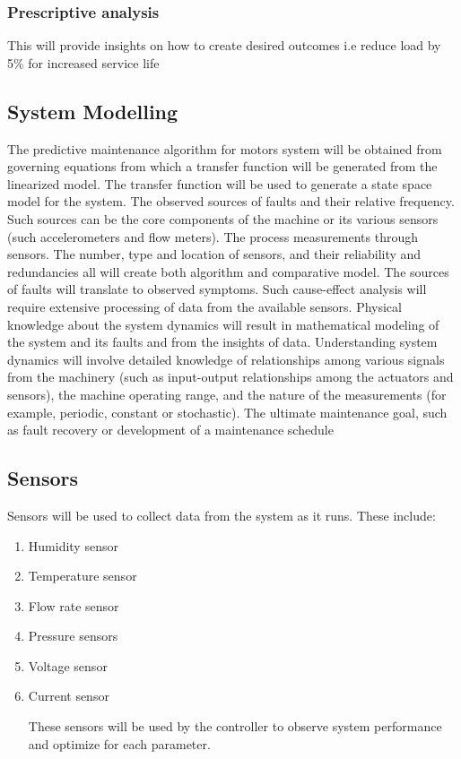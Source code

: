 	\subsubsection{Prescriptive analysis}
	This will provide insights on how to create desired outcomes i.e reduce load by 5\% for increased service life 
	
\subsection{System Modelling}

The predictive maintenance algorithm for motors system will be obtained from governing
equations from which a transfer function will be generated from the linearized model. The
transfer function will be used to generate a state space model for the system.
The observed sources of faults and their relative frequency. Such sources can be the core
components of the machine or its various sensors (such accelerometers and flow meters).
The process measurements through sensors. The number, type and location of sensors,
and their reliability and redundancies all will create both algorithm and comparative
model.
The sources of faults will translate to observed symptoms. Such cause-effect analysis will
require extensive processing of data from the available sensors.
Physical knowledge about the system dynamics will result in mathematical modeling of
the system and its faults and from the insights of data. Understanding system dynamics
will involve detailed knowledge of relationships among various signals from the machinery
(such as input-output relationships among the actuators and sensors), the machine operating
range, and the nature of the measurements (for example, periodic, constant or stochastic).
The ultimate maintenance goal, such as fault recovery or development of a maintenance
schedule




\subsection{ Sensors}
Sensors will be used to collect data from the system as it runs. These include:
\begin{enumerate}
	\item Humidity sensor
	\item Temperature sensor
	\item Flow rate sensor
	\item Pressure sensors
	\item Voltage sensor
	\item Current sensor
	
	These sensors will be used by the controller to observe system performance and optimize for each parameter.
\end{enumerate}

